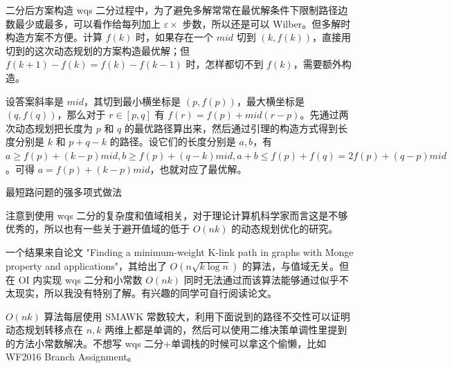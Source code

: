 \documentclass{beamer}
\begin{document}
\begin{frame}{二分后方案构造}
	wqs 二分过程中，为了避免多解常常在最优解条件下限制路径边数最少或最多，可以看作给每列加上 $\varepsilon \times $ 步数，所以还是可以 Wilber。但多解时构造方案不方便。计算 $f(k)$ 时，如果存在一个 $mid$ 切到 $(k,f(k))$，直接用切到的这次动态规划的方案构造最优解；但 $f(k+1)-f(k)=f(k)-f(k-1)$ 时，怎样都切不到 $f(k)$，需要额外构造。\pause
	
	设答案斜率是 $mid$，其切到最小横坐标是 $(p,f(p))$，最大横坐标是 $(q,f(q))$，那么对于 $r \in [p,q]$ 有 $f(r) = f(p)+mid(r-p)$。先通过两次动态规划把长度为 $p$ 和 $q$ 的最优路径算出来，然后通过引理的构造方式得到长度分别是 $k$ 和 $p+q-k$ 的路径。设它们的长度分别是 $a,b$，有 $a \geq f(p)+(k-p)mid,b \geq f(p)+(q-k)mid,a+b \leq f(p)+f(q) = 2f(p)+(q-p)mid$。可得 $a=f(p)+(k-p)mid$，也就对应了最优解。
\end{frame}
\begin{frame}{最短路问题的强多项式做法}
	
	注意到使用 wqs 二分的复杂度和值域相关，对于理论计算机科学家而言这是不够优秀的，所以也有一些关于避开值域的低于 $O(nk)$ 的动态规划优化的研究。
	
	一个结果来自论文 "Finding a minimum-weight K-link path in graphs with Monge property and applications"，其给出了 $O(n \sqrt{k\log n})$ 的算法，与值域无关。但在 OI 内实现 wqs 二分和小常数 $O(nk)$ 同时无法通过而该算法能够通过似乎不太现实，所以我没有特别了解。有兴趣的同学可自行阅读论文。
	
	$O(nk)$ 算法每层使用 SMAWK 常数较大，利用下面说到的路径不交性可以证明动态规划转移点在 $n,k$ 两维上都是单调的，然后可以使用二维决策单调性里提到的方法小常数解决。不想写 wqs 二分+单调栈的时候可以拿这个偷懒，比如 WF2016 Branch Assignment。
\end{frame}
\end{document}
